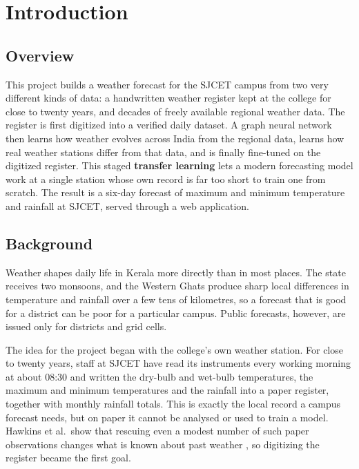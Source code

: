 \setcounter{equation}{0}
\chapter{Introduction}
\label{chap:introduction}

\section{Overview}
\label{sec:overview}

This project builds a weather forecast for the SJCET campus from two very different kinds of data: a handwritten weather register kept at the college for close to twenty years, and decades of freely available regional weather data. The register is first digitized into a verified daily dataset. A graph neural network then learns how weather evolves across India from the regional data, learns how real weather stations differ from that data, and is finally fine-tuned on the digitized register. This staged \textbf{transfer learning} lets a modern forecasting model work at a single station whose own record is far too short to train one from scratch. The result is a six-day forecast of maximum and minimum temperature and rainfall at SJCET, served through a web application.

\section{Background}
\label{sec:background}

Weather shapes daily life in Kerala more directly than in most places. The state receives two monsoons, and the Western Ghats produce sharp local differences in temperature and rainfall over a few tens of kilometres, so a forecast that is good for a district can be poor for a particular campus. Public forecasts, however, are issued only for districts and grid cells.

The idea for the project began with the college's own weather station. For close to twenty years, staff at SJCET have read its instruments every working morning at about 08:30 and written the dry-bulb and wet-bulb temperatures, the maximum and minimum temperatures and the rainfall into a paper register, together with monthly rainfall totals. This is exactly the local record a campus forecast needs, but on paper it cannot be analysed or used to train a model. Hawkins et al.\ show that rescuing even a modest number of such paper observations changes what is known about past weather \cite{ref1}, so digitizing the register became the first goal.

